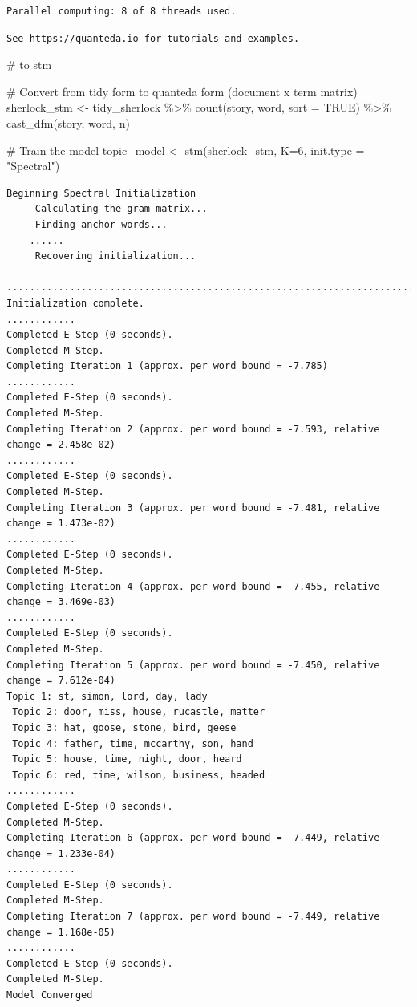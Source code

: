 \documentclass[
  letterpaper,
  DIV=11,
  numbers=noendperiod]{scrreprt}
\newenvironment{Shaded}{\begin{snugshade}}{\end{snugshade}}
\newcommand{\AttributeTok}[1]{\textcolor[rgb]{0.40,0.45,0.13}{#1}}
\newcommand{\CommentTok}[1]{\textcolor[rgb]{0.37,0.37,0.37}{#1}}
\newcommand{\ConstantTok}[1]{\textcolor[rgb]{0.56,0.35,0.01}{#1}}
\newcommand{\DecValTok}[1]{\textcolor[rgb]{0.68,0.00,0.00}{#1}}
\newcommand{\FunctionTok}[1]{\textcolor[rgb]{0.28,0.35,0.67}{#1}}
\newcommand{\NormalTok}[1]{\textcolor[rgb]{0.00,0.23,0.31}{#1}}
\newcommand{\OtherTok}[1]{\textcolor[rgb]{0.00,0.23,0.31}{#1}}
\newcommand{\SpecialCharTok}[1]{\textcolor[rgb]{0.37,0.37,0.37}{#1}}
\newcommand{\StringTok}[1]{\textcolor[rgb]{0.13,0.47,0.30}{#1}}
\begin{document}
\begin{verbatim}
Parallel computing: 8 of 8 threads used.
\end{verbatim}

\begin{verbatim}
See https://quanteda.io for tutorials and examples.
\end{verbatim}

\begin{Shaded}
\begin{Highlighting}[]
                    \CommentTok{\#   to stm}

\CommentTok{\# Convert from tidy form to quanteda form (document x term matrix)}
\NormalTok{sherlock\_stm }\OtherTok{\textless{}{-}}\NormalTok{ tidy\_sherlock }\SpecialCharTok{\%\textgreater{}\%} 
  \FunctionTok{count}\NormalTok{(story, word, }\AttributeTok{sort =} \ConstantTok{TRUE}\NormalTok{) }\SpecialCharTok{\%\textgreater{}\%} 
  \FunctionTok{cast\_dfm}\NormalTok{(story, word, n)}

\CommentTok{\# Train the model}
\NormalTok{topic\_model }\OtherTok{\textless{}{-}} \FunctionTok{stm}\NormalTok{(sherlock\_stm, }\AttributeTok{K=}\DecValTok{6}\NormalTok{, }\AttributeTok{init.type =} \StringTok{"Spectral"}\NormalTok{)}
\end{Highlighting}
\end{Shaded}

\begin{verbatim}
Beginning Spectral Initialization 
     Calculating the gram matrix...
     Finding anchor words...
    ......
     Recovering initialization...
    .............................................................................
Initialization complete.
............
Completed E-Step (0 seconds). 
Completed M-Step. 
Completing Iteration 1 (approx. per word bound = -7.785) 
............
Completed E-Step (0 seconds). 
Completed M-Step. 
Completing Iteration 2 (approx. per word bound = -7.593, relative change = 2.458e-02) 
............
Completed E-Step (0 seconds). 
Completed M-Step. 
Completing Iteration 3 (approx. per word bound = -7.481, relative change = 1.473e-02) 
............
Completed E-Step (0 seconds). 
Completed M-Step. 
Completing Iteration 4 (approx. per word bound = -7.455, relative change = 3.469e-03) 
............
Completed E-Step (0 seconds). 
Completed M-Step. 
Completing Iteration 5 (approx. per word bound = -7.450, relative change = 7.612e-04) 
Topic 1: st, simon, lord, day, lady 
 Topic 2: door, miss, house, rucastle, matter 
 Topic 3: hat, goose, stone, bird, geese 
 Topic 4: father, time, mccarthy, son, hand 
 Topic 5: house, time, night, door, heard 
 Topic 6: red, time, wilson, business, headed 
............
Completed E-Step (0 seconds). 
Completed M-Step. 
Completing Iteration 6 (approx. per word bound = -7.449, relative change = 1.233e-04) 
............
Completed E-Step (0 seconds). 
Completed M-Step. 
Completing Iteration 7 (approx. per word bound = -7.449, relative change = 1.168e-05) 
............
Completed E-Step (0 seconds). 
Completed M-Step. 
Model Converged 
\end{verbatim}
\end{document}
